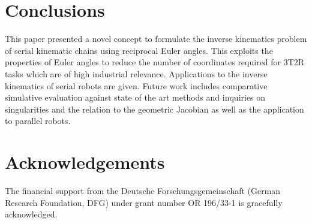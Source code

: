 \documentclass{svproc}
\begin{document}
\section{Conclusions}
\label{sec:Conclusion}

This paper presented a novel concept to formulate the inverse kinematics problem of serial kinematic chains using reciprocal Euler angles.
This exploits the properties of Euler angles to reduce the number of coordinates required for 3T2R tasks which are of high industrial relevance.
Applications to the inverse kinematics of serial robots are given.
%
Future work includes comparative simulative evaluation against state of the art methods and inquiries on singularities and the relation to the geometric Jacobian as well as the application to parallel robots.


\section*{Acknowledgements}

The financial support from the Deutsche Forschungsgemeinschaft (German Research Foundation, DFG) under grant number OR 196/33-1 is gracefully acknowledged.



\end{document}

